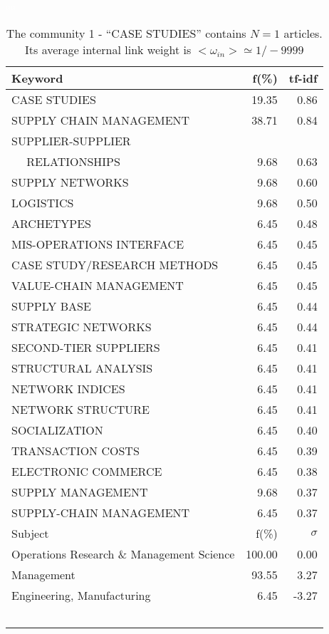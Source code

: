 \documentclass[a4paper,11pt]{report}
\begin{document}
\begin{landscape}
\clearpage

\begin{table}[!ht]
\caption{The community 1 - ``CASE STUDIES'' contains $N = 1$ articles. Its average internal link weight is $<\omega_{in}> \simeq 1/-9999$ }
\textcolor{white}{aa}\\
{\scriptsize\begin{tabular}{|l r  r|}
\hline
Keyword & f(\%) & tf-idf \\
\hline
CASE STUDIES & 19.35 & 0.86\\
SUPPLY CHAIN MANAGEMENT & 38.71 & 0.84\\
SUPPLIER-SUPPLIER &  &\\
$\quad$ RELATIONSHIPS & 9.68 & 0.63\\
SUPPLY NETWORKS & 9.68 & 0.60\\
LOGISTICS & 9.68 & 0.50\\
ARCHETYPES & 6.45 & 0.48\\
MIS-OPERATIONS INTERFACE & 6.45 & 0.45\\
CASE STUDY/RESEARCH METHODS & 6.45 & 0.45\\
VALUE-CHAIN MANAGEMENT & 6.45 & 0.45\\
SUPPLY BASE & 6.45 & 0.44\\
STRATEGIC NETWORKS & 6.45 & 0.44\\
SECOND-TIER SUPPLIERS & 6.45 & 0.41\\
STRUCTURAL ANALYSIS & 6.45 & 0.41\\
NETWORK INDICES & 6.45 & 0.41\\
NETWORK STRUCTURE & 6.45 & 0.41\\
SOCIALIZATION & 6.45 & 0.40\\
TRANSACTION COSTS & 6.45 & 0.39\\
ELECTRONIC COMMERCE & 6.45 & 0.38\\
SUPPLY MANAGEMENT & 9.68 & 0.37\\
SUPPLY-CHAIN MANAGEMENT & 6.45 & 0.37\\
\hline
\hline
Subject & f(\%) & $\sigma$\\
\hline
Operations Research \& Management Science & 100.00 & 0.00\\
Management & 93.55 & 3.27\\
Engineering, Manufacturing & 6.45 & -3.27\\
 &  & \\
 &  & \\
 &  & \\
 &  & \\
 &  & \\

\end{tabular}}
\end{table}
\end{landscape}
\end{document}
